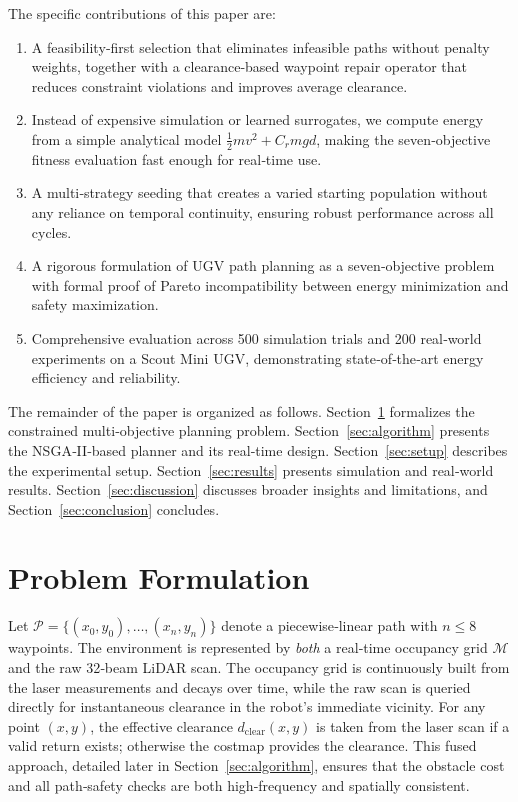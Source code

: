 \documentclass[lettersize,journal]{IEEEtran}
\begin{document}
The specific contributions of this paper are:
\begin{enumerate}
  \item A feasibility‑first selection that eliminates infeasible paths without
        penalty weights, together with a clearance‑based waypoint repair operator
        that reduces constraint violations and improves average clearance.
  \item Instead of expensive simulation or learned surrogates, we compute
        energy from a simple analytical model $\frac12 m v^2 + C_r m g d$,
        making the seven‑objective fitness evaluation fast enough for real‑time
        use.
  \item A multi‑strategy seeding that creates a varied starting population
        without any reliance on temporal continuity, ensuring robust performance
        across all cycles.
  \item A rigorous formulation of UGV path planning as a seven‑objective
        problem with formal proof of Pareto incompatibility between energy
        minimization and safety maximization.
  \item Comprehensive evaluation across 500 simulation trials and 200
        real‑world experiments on a Scout Mini UGV, demonstrating state‑of‑the‑art
        energy efficiency and reliability.
\end{enumerate}
The remainder of the paper is organized as follows. Section~\ref{sec:formulation}
formalizes the constrained multi‑objective planning problem.
Section~\ref{sec:algorithm} presents the NSGA‑II‑based planner and its
real‑time design. Section~\ref{sec:setup} describes the experimental setup.
Section~\ref{sec:results} presents simulation and real‑world results.
Section~\ref{sec:discussion} discusses broader insights and limitations, and
Section~\ref{sec:conclusion} concludes.

\section{Problem Formulation}
\label{sec:formulation}

Let $\mathcal{P} = \{(x_0,y_0),\ldots,(x_n,y_n)\}$ denote a piecewise‑linear
path with $n \le 8$ waypoints. The environment is represented by \emph{both}
a real‑time occupancy grid $\mathcal{M}$ and the raw 32‑beam LiDAR scan. The
occupancy grid is continuously built from the laser measurements and decays
over time, while the raw scan is queried directly for instantaneous clearance
in the robot’s immediate vicinity. For any point $(x,y)$, the effective
clearance $d_{\mathrm{clear}}(x,y)$ is taken from the laser scan if a valid
return exists; otherwise the costmap provides the clearance. This fused
approach, detailed later in Section~\ref{sec:algorithm}, ensures that the
obstacle cost and all path‑safety checks are both high‑frequency and spatially
consistent.
\end{document}
